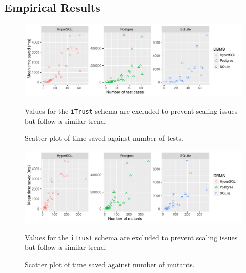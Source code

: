 \subsection{Empirical Results}

\begin{table}[t]
  \caption{\label{tbl:time_saved_by_dbms_table}
    Time saving summary.
  }\vspace{1em}
  \scriptsize
  \centering
\end{table}

\begin{figure}[t]
  \centering
  \includegraphics[width=6in]{graphics/time_saved_vs_tests_scatter_noitrust_facetdbms.pdf}
  \caption{Scatter plot of time saved against number of tests.}
  {\small Values for the \texttt{iTrust} schema are excluded to prevent scaling issues but follow a similar trend.}
\end{figure}

\begin{figure}[t]
  \centering
  \includegraphics[width=6in]{graphics/time_saved_vs_mutants_scatter_noitrust_facetdbms.pdf}
  \caption{Scatter plot of time saved against number of mutants.}
  {\small Values for the \texttt{iTrust} schema are excluded to prevent scaling issues but follow a similar trend.}
\end{figure}

